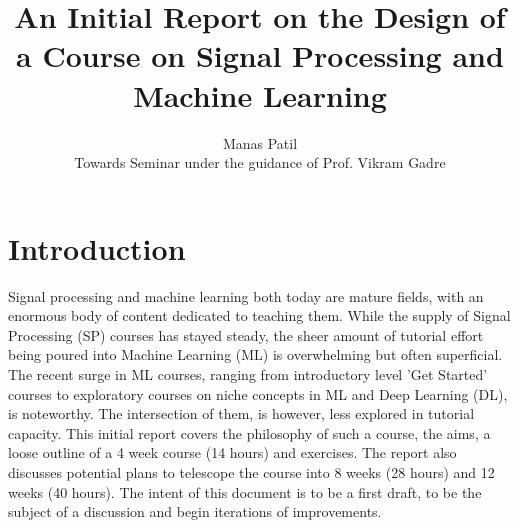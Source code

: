 \documentclass[12pt]{article}
\title{An Initial Report on the Design of a Course on Signal Processing and Machine Learning}
\author{Manas Patil \\Towards Seminar under the guidance of Prof. Vikram Gadre}
\date{}
\begin{document}
\maketitle

\section{Introduction}
Signal processing and machine learning both today are mature fields, with an enormous body of content dedicated to teaching them. While the supply of Signal Processing (SP) courses has stayed steady, the sheer amount of tutorial effort being poured into Machine Learning (ML) is overwhelming but often superficial. The recent surge in ML courses, ranging from introductory level 'Get Started' courses to exploratory courses on niche concepts in ML and Deep Learning (DL), is noteworthy. The intersection of them, is however, less explored in tutorial capacity. This initial report covers the philosophy of such a course, the aims, a loose outline of a 4 week course (14 hours) and exercises. The report also discusses potential plans to telescope the course into 8 weeks (28 hours) and 12 weeks (40 hours). The intent of this document is to be a first draft, to be the subject of a discussion and begin iterations of improvements.
\end{document}
